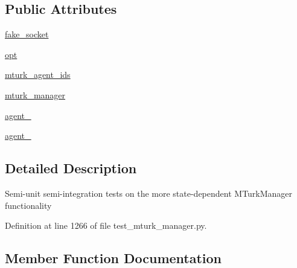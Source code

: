 \subsection*{Public Attributes}
\begin{DoxyCompactItemize}
\item 
\hyperlink{classparlai_1_1mturk_1_1core_1_1test_1_1test__mturk__manager_1_1TestMTurkManagerConnectedFunctions_a3dfd420df777d0308e0e625311a66b2b}{fake\+\_\+socket}
\item 
\hyperlink{classparlai_1_1mturk_1_1core_1_1test_1_1test__mturk__manager_1_1TestMTurkManagerConnectedFunctions_ab80d83712b2d7749f214e9732d62a886}{opt}
\item 
\hyperlink{classparlai_1_1mturk_1_1core_1_1test_1_1test__mturk__manager_1_1TestMTurkManagerConnectedFunctions_a2f9acd81ce0c81968cad27572cf6d204}{mturk\+\_\+agent\+\_\+ids}
\item 
\hyperlink{classparlai_1_1mturk_1_1core_1_1test_1_1test__mturk__manager_1_1TestMTurkManagerConnectedFunctions_a38b88396cc47e219b066ea3ae3e7adf1}{mturk\+\_\+manager}
\item 
\hyperlink{classparlai_1_1mturk_1_1core_1_1test_1_1test__mturk__manager_1_1TestMTurkManagerConnectedFunctions_a5ea436b204f4d8f9d1033f3b6b386c8f}{agent\+\_}
\item 
\hyperlink{classparlai_1_1mturk_1_1core_1_1test_1_1test__mturk__manager_1_1TestMTurkManagerConnectedFunctions_a090084d206eee145ed6c0e7f10ce503c}{agent\+\_}
\end{DoxyCompactItemize}


\subsection{Detailed Description}
\begin{DoxyVerb}Semi-unit semi-integration tests on the more state-dependent
MTurkManager functionality\end{DoxyVerb}
 

Definition at line 1266 of file test\+\_\+mturk\+\_\+manager.\+py.



\subsection{Member Function Documentation}
\mbox{\label{classparlai_1_1mturk_1_1core_1_1test_1_1test__mturk__manager_1_1TestMTurkManagerConnectedFunctions_af2e2774f637d81a8bfe1df5ec9e884ad}} 
